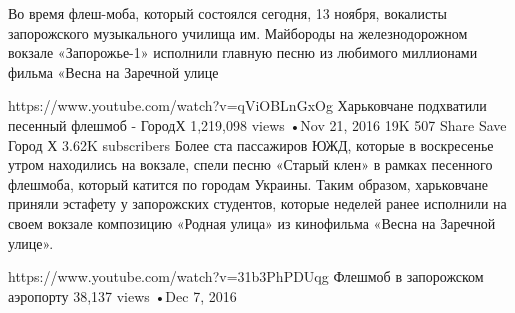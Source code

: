 Во время флеш-моба, который состоялся сегодня, 13 ноября, вокалисты запорожского музыкального училища им. Майбороды на железнодорожном вокзале «Запорожье-1» исполнили главную песню из любимого миллионами фильма «Весна на Заречной улице

https://www.youtube.com/watch?v=qViOBLnGxOg
Харьковчане подхватили песенный флешмоб - ГородХ
1,219,098 views
•Nov 21, 2016
19K
507
Share
Save
Город Х
3.62K subscribers
Более ста пассажиров ЮЖД, которые в воскресенье утром находились на вокзале, спели песню «Старый клен» в рамках песенного флешмоба, который катится по городам Украины. Таким образом, харьковчане приняли эстафету у запорожских студентов, которые неделей ранее исполнили на своем вокзале композицию «Родная улица» из кинофильма «Весна на Заречной улице».

https://www.youtube.com/watch?v=31b3PhPDUqg
Флешмоб в запорожском аэропорту
38,137 views
•Dec 7, 2016

